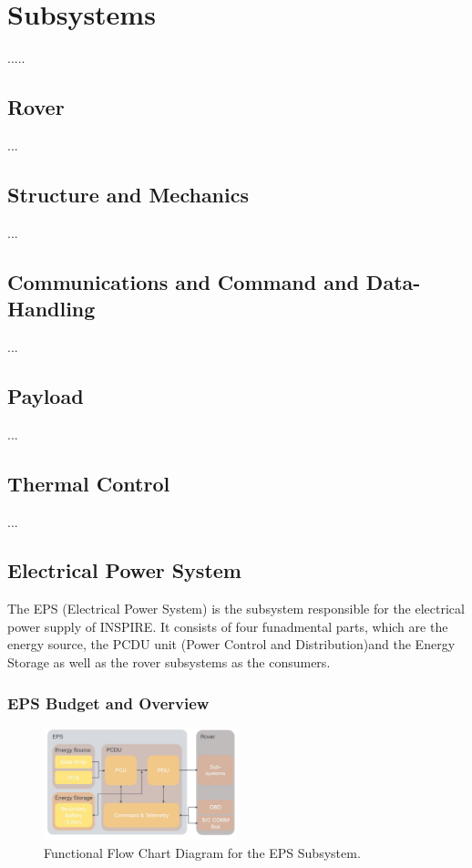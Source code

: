 \chapter{Subsystems}
\label{chap:subsystems}
.....



\section{Rover}
\label{sec:rover}
...
\section{Structure and Mechanics}
\label{sec:mechanics}
...
\section{Communications and Command and Data-Handling}
\label{sec:comm}
...
\section{Payload}
\label{sec:payload}
...
\section{Thermal Control}
\label{sec:thermalcontrol}
...
\section{Electrical Power System}
\label{sec:EPS}
The EPS (Electrical Power System) is the subsystem responsible for the electrical power supply of INSPIRE. It consists of four funadmental parts, which are the energy source, the PCDU unit (Power Control and Distribution)and the Energy Storage as well as the rover subsystems as the consumers.

\subsection{EPS Budget and Overview}

\begin{figure}[htb]
{\centering
\includegraphics[width=0.5\textwidth]{Media/epsflowchart}
\caption{Functional Flow Chart Diagram for the EPS Subsystem.}
\label{fig:epsflowchart}
}
\end{figure}


